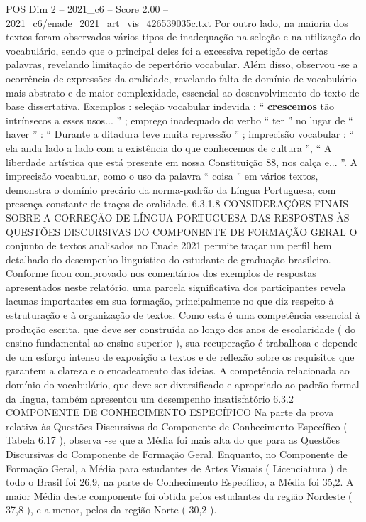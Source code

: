 \begin{textsample}{POS Dim 2 – 2021\_c6 – Score 2.00 – 2021\_c6/enade\_2021\_art\_vis\_426539035c.txt}
Por outro lado, na maioria dos textos foram observados vários tipos de inadequação na seleção e na utilização do vocabulário, sendo que o principal deles foi a excessiva repetição de certas palavras, revelando limitação de repertório vocabular.
Além disso, observou -se a ocorrência de expressões da oralidade, revelando falta de domínio de vocabulário mais abstrato e de maior complexidade, essencial ao desenvolvimento do texto de base dissertativa.
Exemplos : seleção vocabular indevida : “ \textbf{crescemos} tão intrínsecos a esses usos... ” ; emprego inadequado do verbo “ ter ” no lugar de “ haver ” : “ Durante a ditadura teve muita repressão ” ; imprecisão vocabular : “ ela anda lado a lado com a existência do que conhecemos de cultura ”, “ A liberdade artística que está presente em nossa Constituição 88, nos calça e... ”.
A imprecisão vocabular, como o uso da palavra “ coisa ” em vários textos, demonstra o domínio precário da norma-padrão da Língua Portuguesa, com presença constante de traços de oralidade. 6.3.1.8 CONSIDERAÇÕES FINAIS SOBRE A CORREÇÃO DE LÍNGUA PORTUGUESA DAS RESPOSTAS ÀS QUESTÕES DISCURSIVAS DO COMPONENTE DE FORMAÇÃO GERAL O conjunto de textos analisados no Enade 2021 permite traçar um perfil bem detalhado do desempenho linguístico do estudante de graduação brasileiro.
Conforme ficou comprovado nos comentários dos exemplos de respostas apresentados neste relatório, uma parcela significativa dos participantes revela lacunas importantes em sua formação, principalmente no que diz respeito à estruturação e à organização de textos.
Como esta é uma competência essencial à produção escrita, que deve ser construída ao longo dos anos de escolaridade ( do ensino fundamental ao ensino superior ), sua recuperação é trabalhosa e depende de um esforço intenso de exposição a textos e de reflexão sobre os requisitos que garantem a clareza e o encadeamento das ideias.
A competência relacionada ao domínio do vocabulário, que deve ser diversificado e apropriado ao padrão formal da língua, também apresentou um desempenho insatisfatório 6.3.2 COMPONENTE DE CONHECIMENTO ESPECÍFICO Na parte da prova relativa às Questões Discursivas do Componente de Conhecimento Específico ( Tabela 6.17 ), observa -se que a Média foi mais alta do que para as Questões Discursivas do Componente de Formação Geral.
Enquanto, no Componente de Formação Geral, a Média para estudantes de Artes Visuais ( Licenciatura ) de todo o Brasil foi 26,9, na parte de Conhecimento Específico, a Média foi 35,2.
A maior Média deste componente foi obtida pelos estudantes da região Nordeste ( 37,8 ), e a menor, pelos da região Norte ( 30,2 ).

\end{textsample}
